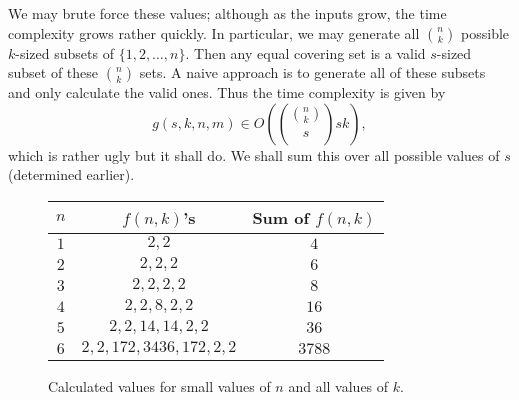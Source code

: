 \documentclass[a4paper, 12pt]{article}
\begin{document}
\begin{observation}
    We may brute force these values; although as the inputs grow, the time complexity grows rather quickly. In particular, we may generate all \( \binom{n}{k} \) possible \( k \)-sized subsets of \( \{ 1, 2, \ldots, n \} \). Then any equal covering set is a valid \( s \)-sized subset of these \( \binom{n}{k} \) sets. A naive approach is to generate all of these subsets and only calculate the valid ones. Thus the time complexity is given by
    \[
        g(s, k, n, m) \in O\left( \binom{\binom{n}{k}}{s} sk \right)
    ,\]
    which is rather ugly but it shall do. We shall sum this over all possible values of \( s \) (determined earlier).
\end{observation}

\begin{figure}[b]
    \centering
    \begin{tabular}{|c|c|c|}
        \hline
        \( n \) & \( f(n, k) \)'s & Sum of \( f(n, k) \) \\
        \hline
        \( 1 \) & \( 2, 2 \) & \( 4 \) \\
        \( 2 \) & \( 2, 2, 2 \) & \( 6 \) \\
        \( 3 \) & \( 2, 2, 2, 2 \) & \( 8 \) \\
        \( 4 \) & \( 2, 2, 8, 2, 2 \) & \( 16 \) \\
        \( 5 \) & \( 2, 2, 14, 14, 2, 2 \) & \( 36 \) \\
        \( 6 \) & \( 2, 2, 172, 3436, 172, 2, 2 \) & \( 3788 \) \\
        \hline
    \end{tabular}
    \caption{Calculated values for small values of \( n \) and all values of \( k \).}
\end{figure}
\end{document}
